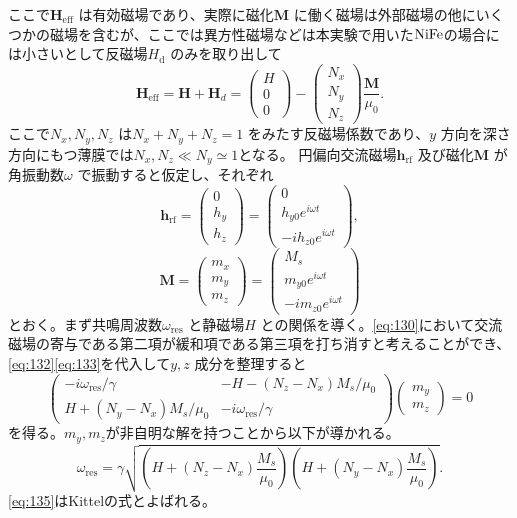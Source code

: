 \documentclass[dvipdfmx]{jsreport}
\numberwithin{equation}{chapter}
\numberwithin{table}{chapter}
\begin{document}
ここで$\bm{H}_\text{eff} $ は有効磁場であり、実際に磁化$\bm{M}$ に働く磁場は外部磁場の他にいくつかの磁場を含むが、ここでは異方性磁場などは本実験で用いた$\ce{NiFe}$の場合には小さいとして反磁場$H_\text{d} $ のみを取り出して
\begin{equation}
\label{eq:131}
	\bm{H}_\text{eff} =\bm{H}+\bm{H}_d=\begin{pmatrix} H\\0\\0 \end{pmatrix} -\begin{pmatrix} N_x\\N_y\\N_z \end{pmatrix} \frac{\bm{M}}{\mu_0}
.\end{equation}
ここで$N_x,N_y,N_z$ は$N_x+N_y+N_z=1$ をみたす反磁場係数であり、$y$ 方向を深さ方向にもつ薄膜では$N_x,N_z\ll N_y\simeq 1$となる。
円偏向交流磁場$\bm{h}_\text{rf} $ 及び磁化$\bm{M}$ が角振動数$\omega$ で振動すると仮定し、それぞれ
\begin{equation}
\label{eq:132}
	\bm{h}_\text{rf} =\begin{pmatrix} 0\\h_y\\h_z \end{pmatrix} = \begin{pmatrix} 0\\h_{y0}e^{i\omega t}\\-ih_{z 0}e^{i\omega t} \end{pmatrix} 
,\end{equation}
\begin{equation}
\label{eq:133}
	\bm{M} =\begin{pmatrix} m_x\\m_y\\m_z \end{pmatrix} = \begin{pmatrix} M_s\\m_{y0}e^{i\omega t}\\-im_{z 0}e^{i\omega t} \end{pmatrix} 
\end{equation}
とおく。まず共鳴周波数$\omega_\text{res} $ と静磁場$H$ との関係を導く。\eqref{eq:130}において交流磁場の寄与である第二項が緩和項である第三項を打ち消すと考えることができ、\eqref{eq:132}\eqref{eq:133}を代入して$y,z$ 成分を整理すると
\begin{equation}
\label{eq:134}
\begin{pmatrix} -i \omega_\text{res}  /\gamma&-H-(N_z-N_x) M_s /\mu_0 \\ H+(N_y-N_x) M_s /\mu_0 & -i \omega_\text{res} /\gamma\end{pmatrix} \begin{pmatrix} m_y \\ m_z \end{pmatrix} =0
\end{equation}
を得る。$m_y,m_z$が非自明な解を持つことから以下が導かれる。
\begin{equation}
\label{eq:135}
	\omega_\text{res} =\gamma \sqrt{\left( H+(N_z-N_x) \frac{M_s}{\mu_0} \right)\left( H+(N_y-N_x) \frac{M_s}{\mu_0} \right)  } 
.\end{equation}
\eqref{eq:135}はKittelの式とよばれる。
\end{document}
